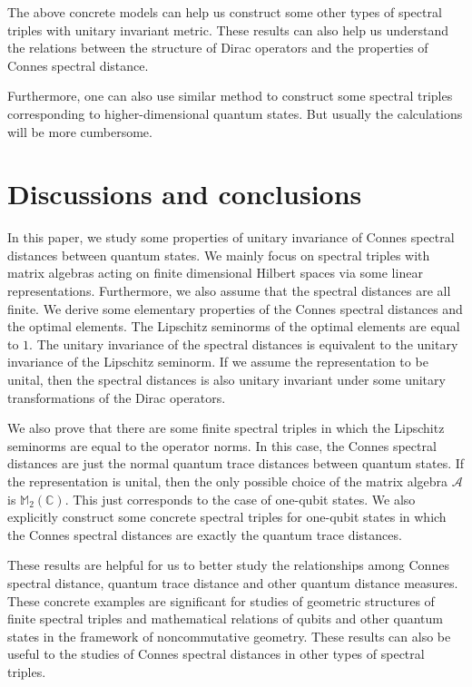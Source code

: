 \documentclass[a4paper,12pt]{article}
\begin{document}
The above concrete models can help us construct some other types of spectral triples with unitary invariant metric. These results can also help us understand the relations between the structure of Dirac operators and the properties of Connes spectral distance.

Furthermore, one can also use similar method to construct some spectral triples corresponding to higher-dimensional quantum states. But usually the calculations will be more cumbersome.



\section{Discussions and conclusions}\label{sec7}

In this paper, we study some properties of unitary invariance of Connes spectral distances between quantum states. We mainly focus on spectral triples with matrix algebras acting on finite dimensional Hilbert spaces via some linear representations. Furthermore, we also assume that the spectral distances are all finite. We derive some elementary properties of the Connes spectral distances and the optimal elements. The Lipschitz seminorms of the optimal elements are equal to $1$.
The unitary invariance of the spectral distances is equivalent to the unitary invariance of the Lipschitz seminorm.
If we assume the representation to be unital, then the spectral distances is also unitary invariant under some unitary transformations of the Dirac operators.

We also prove that there are some finite spectral triples in which the Lipschitz seminorms are equal to the operator norms.
In this case, the Connes spectral distances are just the normal quantum trace distances between quantum states.
If the representation is unital, then the only possible choice of the matrix algebra $\mathcal{A}$ is $\mathbb{M}_2(\mathbb{C})$. This just corresponds to the case of one-qubit states.
We also explicitly construct some concrete spectral triples for one-qubit states in which the Connes spectral distances are exactly the quantum trace distances.

These results are helpful for us to better study the relationships among Connes spectral distance, quantum trace distance and other quantum distance measures.
These concrete examples are significant for studies of geometric structures of finite spectral triples and mathematical relations of qubits and other quantum states in the framework of noncommutative geometry. These results can also be useful to
the studies of Connes spectral distances in other types of spectral triples.
\end{document}
